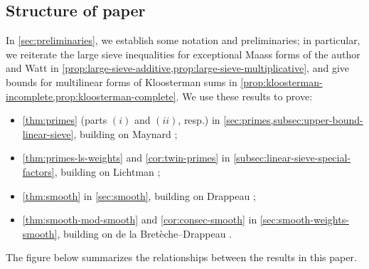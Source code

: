 \documentclass[reqno,11pt]{amsart}
\theoremstyle{remark}
\numberwithin{equation}{section}
\begin{document}
\subsection{Structure of paper}
In \cref{sec:preliminaries}, we establish some notation and preliminaries; in particular, we reiterate the large sieve inequalities for exceptional Maass forms of the author \cite[Theorem 3]{pascadi2024large} and Watt \cite[Theorem 2]{watt1995kloosterman} in \cref{prop:large-sieve-additive,prop:large-sieve-multiplicative}, and give bounds for multilinear forms of Kloosterman sums in \cref{prop:kloosterman-incomplete,prop:kloosterman-complete}. We use these results to prove:
\begin{itemize} 
    \item \cref{thm:primes} (parts $(i)$ and $(ii)$, resp.) in \cref{sec:primes,subsec:upper-bound-linear-sieve}, building on Maynard \cite{maynard2025primes2};
    \item \cref{thm:primes-ls-weights} and \cref{cor:twin-primes} in \cref{subsec:linear-sieve-special-factors}, building on Lichtman \cite{lichtman2023primes}; 
    \item \cref{thm:smooth} in \cref{sec:smooth}, building on Drappeau \cite{drappeau2015theoremes};
    \item \cref{thm:smooth-mod-smooth} and \cref{cor:consec-smooth} in \cref{sec:smooth-weights-smooth}, building on de la Bret\`eche--Drappeau \cite{de2020niveau}.
\end{itemize}
The figure below summarizes the relationships between the results in this paper.
\end{document}
